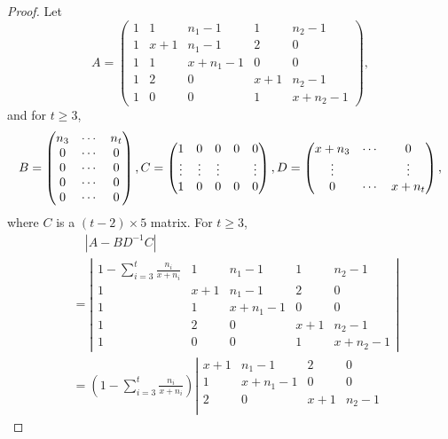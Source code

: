 \documentclass[10pt,a4paper]{amsart}
\numberwithin{equation}{section}
\begin{document}
\begin{proof} Let \[
 A=\begin{pmatrix}
1 & 1 & n_1-1 & 1 & n_2-1 \\
1 & x+1 & n_1-1 & 2 & 0\\
1 & 1 & x+n_1-1 & 0 & 0 \\
1 & 2 & 0 & x+1 & n_2-1 \\
1 & 0 & 0 & 1 & x+n_2-1
\end{pmatrix}, 
\]
and for $t\ge 3$, 
\[
B=\begin{pmatrix}
 n_3 & \cdots & n_t\\
 0 & \cdots & 0\\
 0 & \cdots & 0\\
 0 & \cdots & 0\\
 0 & \cdots & 0\\
\end{pmatrix},\\
 C=\begin{pmatrix}
1 & 0 & 0 & 0 & 0 \\
\vdots & \vdots & \vdots & & \vdots\\
1 & 0 & 0 & 0 & 0 
\end{pmatrix}, 
D=\begin{pmatrix}
x+n_3 & \cdots & 0\\
 \vdots & & \vdots\\
0 & \cdots & x+n_t
\end{pmatrix},
\]
where $C$ is a $(t-2)\times 5$ matrix. For $t\ge 3$,
\begin{align*}
&\quad |A-BD^{-1}C|\\
&=\left| \begin{array}{ccccc}
1-\sum_{i=3}^{t}\frac{n_i}{x+n_i} & 1 & n_1-1 & 1 & n_2-1\\
1 & x+1 & n_1-1 & 2 & 0\\
1 & 1 & x+n_1-1 & 0 & 0\\
1 & 2 & 0 & x+1 & n_2-1\\
1 & 0 & 0 & 1 & x+n_2-1
\end{array} \right| \\
& =\left(1-\sum_{i=3}^{t}\frac{n_i}{x+n_i}\right) \left|\begin{array}{cccc}
x+1 & n_1-1 & 2 & 0\\
1 & x+n_1-1 & 0 & 0\\
2 & 0 & x+1 & n_2-1\\

\end{array}
\end{align*}
\end{proof}
\end{document}
